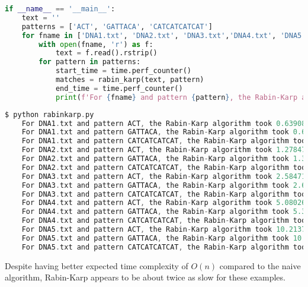 \documentclass[12pt]{article}
\newenvironment{problem}[2][Problem]{\begin{trivlist}
\item[\hskip \labelsep {\bfseries #1}\hskip \labelsep {\bfseries #2.}]}{\end{trivlist}}
\begin{document}
\begin{problem}{3}
\begin{lstlisting}[language=Python, caption=main function code]
if __name__ == '__main__':
    text = ''
    patterns = ['ACT', 'GATTACA', 'CATCATCATCAT']
    for fname in ['DNA1.txt', 'DNA2.txt', 'DNA3.txt','DNA4.txt', 'DNA5.txt']:
        with open(fname, 'r') as f:
            text = f.read().rstrip()
        for pattern in patterns:
            start_time = time.perf_counter()
            matches = rabin_karp(text, pattern)
            end_time = time.perf_counter()
            print(f'For {fname} and pattern {pattern}, the Rabin-Karp algorithm took {end_time-start_time} seconds with {len(matches)} matches')
\end{lstlisting}
\pagebreak
\begin{lstlisting}[language=C, caption=Terminal output running code]
$ python rabinkarp.py 
    For DNA1.txt and pattern ACT, the Rabin-Karp algorithm took 0.639081138993788 seconds with 65495 matches
    For DNA1.txt and pattern GATTACA, the Rabin-Karp algorithm took 0.6668751739998697 seconds with 242 matches
    For DNA1.txt and pattern CATCATCATCAT, the Rabin-Karp algorithm took 0.7319347989978269 seconds with 0 matches
    For DNA2.txt and pattern ACT, the Rabin-Karp algorithm took 1.2784735669993097 seconds with 131034 matches
    For DNA2.txt and pattern GATTACA, the Rabin-Karp algorithm took 1.3436157860051026 seconds with 491 matches
    For DNA2.txt and pattern CATCATCATCAT, the Rabin-Karp algorithm took 1.4682704229999217 seconds with 1 matches
    For DNA3.txt and pattern ACT, the Rabin-Karp algorithm took 2.5847115970027517 seconds with 262192 matches
    For DNA3.txt and pattern GATTACA, the Rabin-Karp algorithm took 2.6529827709964593 seconds with 1002 matches
    For DNA3.txt and pattern CATCATCATCAT, the Rabin-Karp algorithm took 2.936001311005384 seconds with 1 matches
    For DNA4.txt and pattern ACT, the Rabin-Karp algorithm took 5.080261541996151 seconds with 524454 matches
    For DNA4.txt and pattern GATTACA, the Rabin-Karp algorithm took 5.316721924995363 seconds with 1976 matches
    For DNA4.txt and pattern CATCATCATCAT, the Rabin-Karp algorithm took 5.90457762600272 seconds with 5 matches
    For DNA5.txt and pattern ACT, the Rabin-Karp algorithm took 10.213705198999378 seconds with 1050689 matches
    For DNA5.txt and pattern GATTACA, the Rabin-Karp algorithm took 10.634073597997485 seconds with 4161 matches
    For DNA5.txt and pattern CATCATCATCAT, the Rabin-Karp algorithm took 11.496143873002438 seconds with 3 matches
\end{lstlisting}
Despite having better expected time complexity of $O(n)$ compared to the naive algorithm, Rabin-Karp appears to be about twice as slow for these examples.
\end{problem}

 
\end{document}
